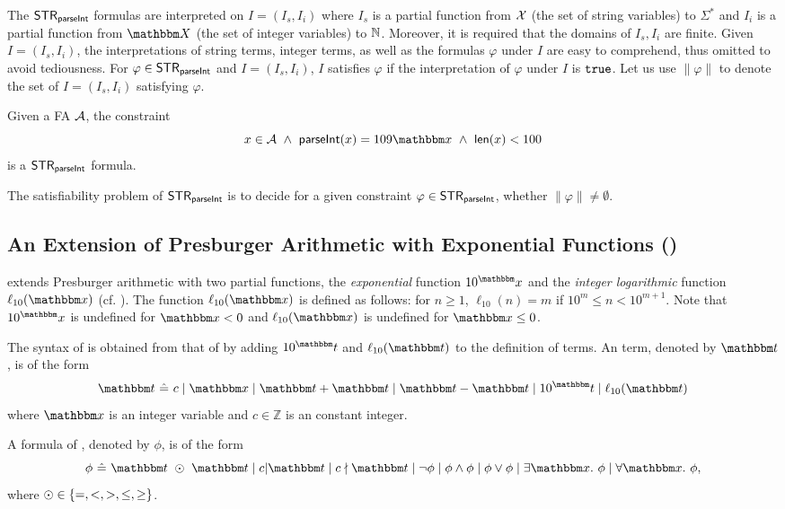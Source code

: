 The ${\sf STR}_{\textsf{parseInt}}$ formulas are interpreted on $I=(I_s, I_i)$ where $I_s$ is a partial function from $\mathcal{X}$ (the set of string variables) to $\Sigma^*$ and $I_i$ is a partial function from $\ivars$ (the set of integer variables) to $\mathbb{N}$. 
Moreover, it is required that the domains of $I_s, I_i$ are finite. Given $I = (I_s, I_i)$, the interpretations of string terms, integer terms, as well as the formulas $\varphi$ under $I$ are easy to comprehend, thus omitted to avoid tediousness. 
For $\varphi \in {\sf STR}_{\textsf{parseInt}}$ and $I = (I_s, I_i)$, $I$ satisfies $\varphi$ if the interpretation of $\varphi$ under $I$ is $\mathtt{true}$.
Let us use $\lVert \varphi \rVert$ to denote the set of $I = (I_s, I_i)$ satisfying $\varphi$.

\begin{example} Given a FA $\mathcal{A}$, the constraint
$$\svarx \in \Aut \ \wedge\ 
\parseInt(\svarx) = 109\ivarx\ \wedge\ 
\len(\svarx) < 100$$
is a ${\sf STR}_{\textsf{parseInt}}$ formula.
\end{example}

The satisfiability problem of ${\sf STR}_{\textsf{parseInt}}$ is to decide for a given constraint $\varphi \in {\sf STR}_{\textsf{parseInt}}$,
whether $\lVert  \varphi \rVert \neq \emptyset$.

\subsection{An Extension of Presburger Arithmetic with Exponential Functions (\paexp)}

{\paexp} extends Presburger arithmetic with two partial functions, the \emph{exponential} function $10^\ivarx$ and the \emph{integer logarithmic} function $\ell_{10}(\ivarx)$ (cf. \cite{Point86}). The function $\ell_{10}(\ivarx)$ is defined as follows: for $n \ge 1$, $\ell_{10}(n) = m$ if $10^m \le n < 10^{m+1}$. Note that $10^\ivarx$ is undefined for $\ivarx<0$ and $\ell_{10}(\ivarx)$ is undefined for $\ivarx\le 0$.

The syntax of {\paexp} is obtained from that of {\pa} by adding $10^\iterm$ and $\ell_{10}(\iterm)$ to the definition of terms. An {\paexp} term, denoted by $\iterm$, is of the form
$$\iterm\ \Def\ c \mid \ivarx \mid \iterm + \iterm \mid \iterm - \iterm \mid 10^\iterm \mid \ell_{10}(\iterm) $$
where $\ivarx$ is an integer variable and $c\in \mathbb Z$ is an constant integer. 

A formula of {\paexp}, denoted by $\phi$, is of the form
$$\phi \ \Def \ \iterm \ \op\ \iterm \mid c \vert \iterm \mid c \nmid \iterm \mid \neg \phi \mid \phi \wedge \phi \mid \phi \vee \phi \mid \exists \ivarx.\ \phi \mid \forall \ivarx.\ \phi,$$
where $\odot \in \{=, < , >, \le, \ge\}$. 

